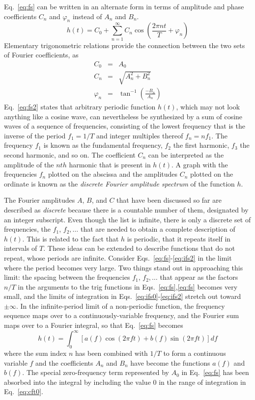 \documentclass{revtex4}
\begin{document}
Eq.~\ref{eq:fs} can be written in an alternate form in terms of amplitude
and phase coefficients $C_n$ and $\varphi_n$ instead of $A_n$ and $B_n$.
\begin{equation}
h(t) = C_0 + \sum_{n=1}^{\infty}C_n\cos\left(\frac{2\pi nt}{T}+\varphi_n\right)
\label{eq:fs2}
\end{equation}
Elementary trigonometric relations provide the connection between the
two sets of Fourier coefficients, as
\begin{eqnarray}
C_0 &=& A_0 \\
C_n &=& \sqrt{A_n^2+B_n^2} \\
\varphi_n &=& \tan^{-1}\left(\frac{-B_n}{A_n}\right)
\end{eqnarray}
Eq.~\ref{eq:fs2} states that arbitrary periodic function $h(t)$, which
may not look anything like a cosine wave, can nevertheless be synthesized
by a sum of cosine waves of a sequence of frequencies, consisting of the
lowest frequency that is the inverse of the period $f_1=1/T$ and integer
multiples thereof $f_n = nf_1$.  The frequency $f_1$ is known as the
fundamental frequency, $f_2$ the first harmonic, $f_3$ the second harmonic,
and so on.  The coefficient $C_n$ can be interpreted as the amplitude of
the $nth$ harmonic that is present in $h(t)$.  A graph with the frequencies
$f_n$ plotted on the abscissa and the amplitudes $C_n$ plotted on the
ordinate is known as the {\em discrete Fourier amplitude spectrum} of 
the function $h$.

The Fourier amplitudes $A$, $B$, and $C$ that have been discussed so far
are described as {\em discrete} because there is a countable number of them,
designated by an integer subscript.  Even though the list is infinite,
there is only a discrete set of frequencies, the $f_1$, $f_2,\ldots$ that
are needed to obtain a complete description of $h(t)$.  This is related
to the fact that $h$ is periodic, that it repeats itself in intervals of
$T$.  These ideas can be extended to describe functions that do not
repeat, whose periods are infinite.  Consider Eqs.~\ref{eq:fs}-\ref{eq:ifs2}
in the limit where the period becomes very large.  Two things stand out in
approaching this limit: the spacing between the frequencies $f_1$,
$f_2,\ldots$ that appear as the factors $n/T$ in the arguments to the
trig functions in Eqs.~\ref{eq:fs},\ref{eq:fs} becomes very small, and
the limits of integration in Eqs.~\ref{eq:ifs0}-\ref{eq:ifs2} stretch
out toward $\pm\infty$.  In the infinite-period limit of a non-periodic
function, the frequency sequence maps over to a continuously-variable
frequency, and the Fourier sum maps over to a Fourier integral, so that
Eq.~\ref{eq:fs} becomes
\begin{equation}
h(t) = \int_{0}^{\infty}\left[a(f)\cos(2\pi ft)+b(f)\sin(2\pi ft)\right]
df \label{eq:cft0}
\end{equation}
where the sum index $n$ has been combined with $1/T$ to form a continuous
variable $f$ and the coefficients $A_n$ and $B_n$ have become the functions
$a(f)$ and $b(f)$.  The special zero-frequency term represented by $A_0$
in Eq.~\ref{eq:fs} has been absorbed into the integral by including the
value 0 in the range of integration in Eq.~\ref{eq:cft0}.
\end{document}
